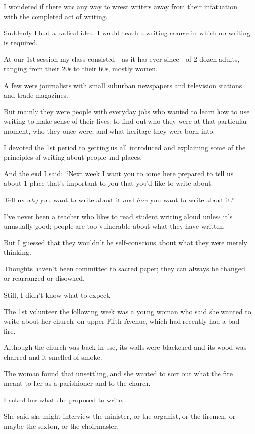 \documentclass{book}
\numberwithin{equation}{section}
\begin{document}
%
I wondered if there was any way to wrest writers away from their infatuation with the completed act of writing.

Suddenly I had a radical idea: I would teach a writing course in which no writing is required.

%
At our 1st session my class consisted - as it has ever since - of 2 dozen adults, ranging from their 20s to their 60s, mostly women.

A few were journalists with small suburban newspapers and television stations and trade magazines.

But mainly they were people with everyday jobs who wanted to learn how to use writing to make sense of their lives: to find out who they were at that particular moment, who they once were, and what heritage they were born into.

%
I devoted the 1st period to getting us all introduced and explaining some of the principles of writing about people and places.

And the end I said: ``Next week I want you to come here prepared to tell us about 1 place that's important to you that you'd like to write about.

Tell us \textit{why} you want to write about it and \textit{how} you want to write about it.''

I've never been a teacher who likes to read student writing aloud unless it's unusually good; people are too vulnerable about what they have written.

But I guessed that they wouldn't be self-conscious about what they were merely thinking.

Thoughts haven't been committed to sacred paper; they can always be changed or rearranged or disowned.

Still, I didn't know what to expect.

%
The 1st volunteer the following week was a young woman who said she wanted to write about her church, on upper Fifth Avenue, which had recently had a bad fire.

Although the church was back in use, its walls were blackened and its wood was charred and it smelled of smoke.

The woman found that unsettling, and she wanted to sort out what the fire meant to her as a parishioner and to the church.

I asked her what she proposed to write.

She said she might interview the minister, or the organist, or the firemen, or maybe the sexton, or the choirmaster.
\end{document}
